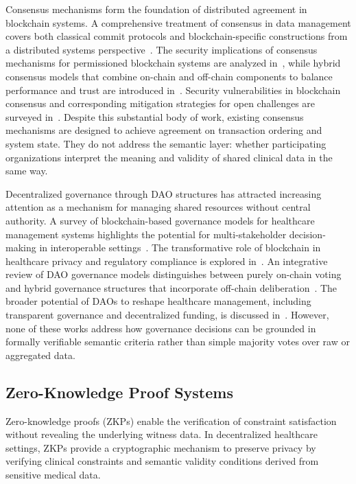 \documentclass[journal]{IEEEtran}
\begin{document}
Consensus mechanisms form the foundation of distributed agreement in
blockchain systems. A comprehensive treatment of consensus in data
management covers both classical commit protocols and
blockchain-specific constructions from a distributed systems
perspective~\cite{10075075}. The security implications of consensus
mechanisms for permissioned blockchain systems are analyzed
in~\cite{Nasir2024}, while hybrid consensus models that combine
on-chain and off-chain components to balance performance and trust are
introduced in~\cite{AlAwamy2025}. Security vulnerabilities in
blockchain consensus and corresponding mitigation strategies for open
challenges are surveyed in~\cite{yakubu2024systematic}. Despite this
substantial body of work, existing consensus mechanisms are designed
to achieve agreement on transaction ordering and system state. They
do not address the semantic layer: whether participating organizations
interpret the meaning and validity of shared clinical data in the same
way.

Decentralized governance through DAO structures has attracted
increasing attention as a mechanism for managing shared resources
without central authority. A survey of blockchain-based governance
models for healthcare management systems highlights the potential for
multi-stakeholder decision-making in interoperable
settings~\cite{Villarreal2023}. The transformative role of blockchain
in healthcare privacy and regulatory compliance is explored
in~\cite{Angurala2025}. An integrative review of DAO governance
models distinguishes between purely on-chain voting and hybrid
governance structures that incorporate off-chain
deliberation~\cite{cabello2024exploring}. The broader potential of
DAOs to reshape healthcare management, including transparent
governance and decentralized funding, is discussed
in~\cite{mateus2023can}. However, none of these works address how
governance decisions can be grounded in formally verifiable semantic
criteria rather than simple majority votes over raw or aggregated
data.

\subsection{Zero-Knowledge Proof Systems}
\label{ss:zkp}

Zero-knowledge proofs (ZKPs) enable the verification of constraint
satisfaction without revealing the underlying witness data. In
decentralized healthcare settings, ZKPs provide a cryptographic
mechanism to preserve privacy by verifying clinical constraints and
semantic validity conditions derived from sensitive medical data.
\end{document}
